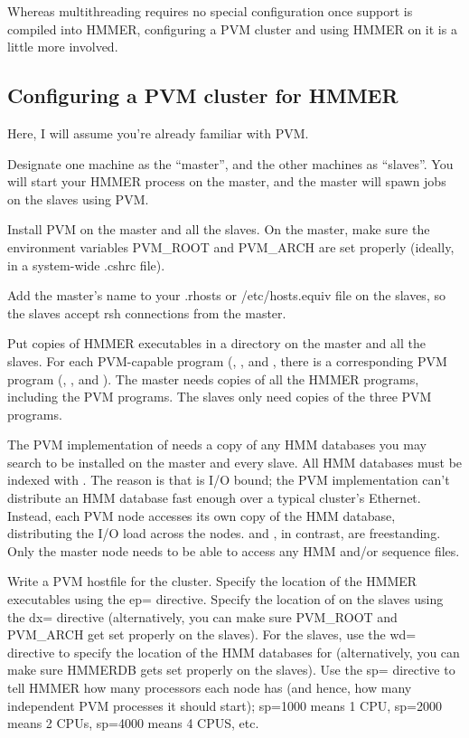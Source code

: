 Whereas multithreading requires no special configuration once support
is compiled into HMMER, configuring a PVM cluster and using HMMER on
it is a little more involved. 

\subsection{Configuring a PVM cluster for HMMER}

Here, I will assume you're already familiar with PVM.

Designate one machine as the ``master'', and the other machines as
``slaves''. You will start your HMMER process on the master, and the
master will spawn jobs on the slaves using PVM.

Install PVM on the master and all the slaves. On the master, make sure
the environment variables PVM\_ROOT and PVM\_ARCH are set properly
(ideally, in a system-wide .cshrc file).

Add the master's name to your .rhosts or /etc/hosts.equiv file on the
slaves, so the slaves accept rsh connections from the master.

Put copies of HMMER executables in a directory on the master and all
the slaves. For each PVM-capable program (,
, and , there is a corresponding PVM program
(, , and
). The master needs copies of all the HMMER
programs, including the PVM programs.  The slaves only need copies of
the three PVM programs.

The PVM implementation of  needs a copy of any HMM
databases you may search to be installed on the master and every
slave. All HMM databases must be indexed with . The
reason is that  is I/O bound; the PVM implementation
can't distribute an HMM database fast enough over a typical cluster's
Ethernet. Instead, each PVM node accesses its own copy of the HMM
database, distributing the I/O load across the nodes.
 and , in contrast, are
freestanding. Only the master node needs to be able to access any HMM
and/or sequence files.

Write a PVM hostfile for the cluster. Specify the location of the
HMMER executables using the ep= directive. Specify the location of
 on the slaves using the dx= directive (alternatively, you
can make sure PVM\_ROOT and PVM\_ARCH get set properly on the
slaves). For the slaves, use the wd= directive to specify the location
of the HMM databases for  (alternatively, you can make
sure HMMERDB gets set properly on the slaves). Use the sp= directive
to tell HMMER how many processors each node has (and hence, how many
independent PVM processes it should start); sp=1000 means 1 CPU,
sp=2000 means 2 CPUs, sp=4000 means 4 CPUS, etc.


